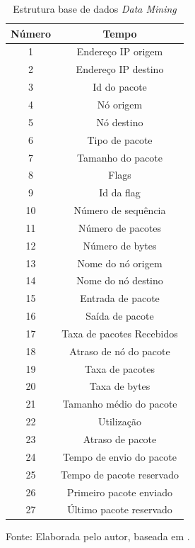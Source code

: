 \begin{table}[!b]
	\centering
	\begin{threeparttable}
		\caption{Estrutura base de dados \textit{Data Mining}}
		\label{Tab:DataMining}
		\begin{tabular}{c c }
			\toprule
			\textbf{Número} & \textbf{Tempo}
			\\ \midrule
			1 &  Endereço IP origem  \\ \midrule
			2 &  Endereço IP destino  \\ \midrule
			3 &  Id do pacote  \\ \midrule
			4 &  Nó origem  \\ \midrule
			5 &  Nó destino  \\ \midrule
			6 &  Tipo de pacote  \\ \midrule
			7 &  Tamanho do pacote  \\ \midrule
			8 &  Flags  \\ \midrule
			9 &   Id da flag  \\ \midrule
			10 &  Número de sequência  \\ \midrule
			11 &  Número de pacotes  \\ \midrule
			12 &  Número de bytes  \\ \midrule
			13 &  Nome do nó origem  \\ \midrule
			14 &  Nome do nó destino  \\ \midrule
			15 &  Entrada de pacote  \\ \midrule
			16 &  Saída de pacote  \\ \midrule
			17 &  Taxa de pacotes Recebidos \\ \midrule%
			18 &  Atraso de nó do pacote  \\ \midrule
			19 &  Taxa de pacotes\\ \midrule
			20 &  Taxa de bytes  \\ \midrule
			21 &  Tamanho  médio do pacote  \\ \midrule
			22 &  Utilização  \\ \midrule
			23 &  Atraso de pacote  \\ \midrule
			24 &  Tempo de envio do pacote  \\ \midrule
			25 &  Tempo de pacote reservado  \\ \midrule
			26 &  Primeiro pacote enviado  \\ \midrule
			27 &  Último pacote reservado \\ \bottomrule
		\end{tabular}
		{Fonte: Elaborada pelo autor, baseada em \cite{DataMining}.}
	\end{threeparttable}
\end{table}


